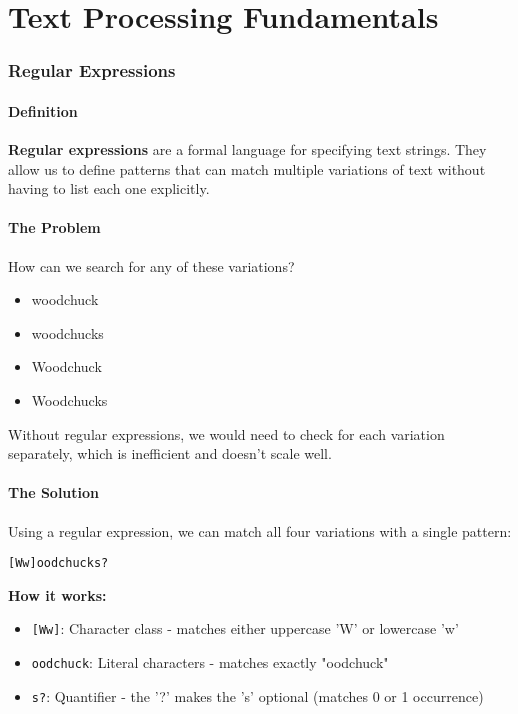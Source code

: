 \documentclass[11pt,a4paper]{article}
\theoremstyle{definition}
\theoremstyle{plain}
\theoremstyle{remark}
\begin{document}
\newpage
\part{Text Processing Fundamentals}

\section{Regular Expressions}

\subsection{Definition}

\textbf{Regular expressions} are a formal language for specifying text strings. They allow us to define patterns that can match multiple variations of text without having to list each one explicitly.

\subsection{The Problem}

How can we search for any of these variations?
\begin{itemize}
    \item woodchuck
    \item woodchucks
    \item Woodchuck
    \item Woodchucks
\end{itemize}

Without regular expressions, we would need to check for each variation separately, which is inefficient and doesn't scale well.

\subsection{The Solution}

Using a regular expression, we can match all four variations with a single pattern:

\begin{verbatim}
[Ww]oodchucks?
\end{verbatim}

\textbf{How it works:}
\begin{itemize}
    \item \texttt{[Ww]}: Character class - matches either uppercase 'W' or lowercase 'w'
    \item \texttt{oodchuck}: Literal characters - matches exactly "oodchuck"
    \item \texttt{s?}: Quantifier - the '?' makes the 's' optional (matches 0 or 1 occurrence)
\end{itemize}
\end{document}
